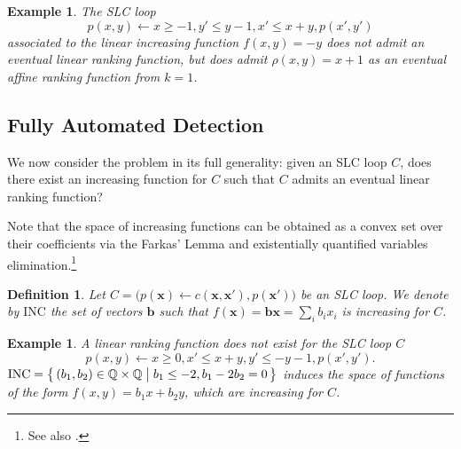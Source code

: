 \documentclass{acm_proc_article-sp}
\newtheorem{definition}[theorem]{Definition}
\newtheorem{example}[theorem]{Example}
\newcommand{\inc}{\mathrm{INC}}
\begin{document}
\begin{example}
\label{ex-fn-rng-aff-evt-p}
The SLC loop
\[
  p(x, y) \leftarrow x \ge -1, y' \le y - 1, x' \le x + y, p(x', y')
\]
associated to the linear increasing function $f(x,y) = -y$
does not admit an eventual linear ranking function, but does admit
$\rho(x,y)=x+1$ as an eventual affine ranking function from $k=1$.
\end{example}



\subsection{Fully Automated Detection}
\label{sec:elrf-full-detection}

We now consider the problem in its full generality:
given an SLC loop $C$, does there exist an increasing function for $C$
such that $C$ admits an eventual linear ranking function?

Note that the space of increasing functions can be obtained
as a convex set over their coefficients
via the Farkas' Lemma and existentially quantified variables
elimination.\footnote{See also \cite[Section 4.4]{BagnaraMPZ12IC}.}

\begin{definition}
\label{def-inc}
Let
\(
  C = \bigl(
        p(\mathbf{x}) \leftarrow c(\mathbf{x}, \mathbf{x}'), p(\mathbf{x}')
      \bigr)
\)
be an SLC loop.
We denote by $\inc$ the set of vectors $\mathbf{b}$
such that $f(\mathbf{x}) = \mathbf{b}\mathbf{x} = \sum_i b_i x_i$
is increasing for $C$.
\end{definition}

\begin{example}
\label{ex-full-detection}
A linear ranking function does not exist for the SLC loop $C$
\[
  p(x, y) \leftarrow x \ge 0, x' \le x+y, y' \le  -y - 1, p(x', y').
\]
\(
  \inc = \bigl\{\,
                   (b_1,b_2) \in \Qset \times \Qset
                  \bigm|
                    b_1 \le -2, b_1 - 2b_2 = 0
                  \,\bigr\}
\)
induces the space of functions of the form $f(x, y)= b_1 x + b_2 y$,
which are increasing for $C$.
\end{example}
\end{document}
